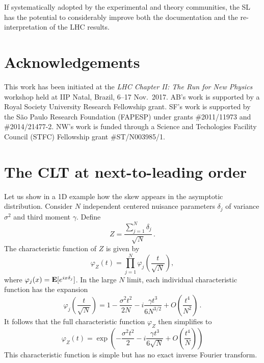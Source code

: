 \documentclass[11pt]{article}
\newcommand{\be}{\begin{equation}}
\newcommand{\ee}{\end{equation}}
\begin{document}
 If systematically adopted by the experimental and theory communities, the SL has the potential to considerably improve both the documentation and the re-interpretation of the LHC results.







\section*{Acknowledgements}

 This work has been initiated at the \textit{LHC Chapter II: The Run for New Physics} workshop held at IIP Natal, Brazil,  6--17 Nov.\ 2017. 
 AB's work is supported by a Royal Society University Research Fellowship grant.
 SF's work is supported by the S\~ao Paulo Research Foundation (FAPESP) under grants \#2011/11973 and \#2014/21477-2.
 NW's work is funded through a Science and Techologies Facility Council (STFC) Fellowship grant \#ST/N003985/1.

\appendix

\section{The CLT at next-to-leading order}
\label{app:skew}


Let us show in a 1D example how the skew appears  in the asymptotic distribution. Consider $N$ independent centered nuisance parameters $\delta_j$ of variance $\sigma^2$ and third moment $\gamma$. Define \be Z=\frac{\sum_{j=1}^N \delta_j}{\sqrt{N}}\,.
\ee
The characteristic function of $Z$ is given by
\be
\varphi_Z(t)=\prod_{j=1}^N\varphi_{j}\left(\frac{t}{\sqrt{N}}\right),
\ee
where $\varphi_{j}(x) = {\bf E}[e^{ix\delta_{j}}]$.
 In the large $N$ limit, each individual characteristic function has the expansion
\be
\varphi_{j}\left(\frac{t}{\sqrt{N}}\right)= 1-\frac{\sigma^2 t^2}{2N}-i \frac{\gamma t^3}{6 N^{3/2}} +O\left(\frac{t^4}{N^2}\right)\,.
\ee
It follows that the full characteristic function $\varphi_Z$ then simplifies to
\be
\varphi_Z(t)=\exp\left(-\frac{\sigma^2 t^2}{2}-i \frac{\gamma t^3}{6 \sqrt{N}} +O\left(\frac{t^4}{N}\right)\right) \label{eq:CF_CLT}
 \ee
 This characteristic function is simple but has no exact inverse Fourier transform.
\end{document}
